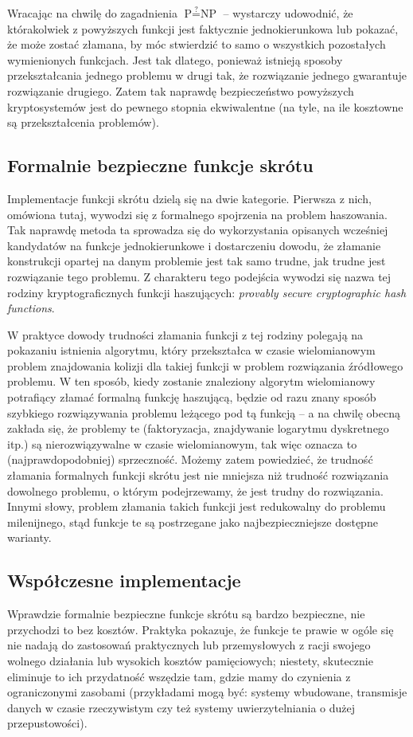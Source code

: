 \documentclass[12pt,a4paper,twoside]{article}
\begin{document}
Wracając na chwilę do zagadnienia $\textrm{P} \stackrel{?}{=} \textrm{NP}$ --
wystarczy udowodnić, że którakolwiek z powyższych funkcji jest faktycznie
jednokierunkowa lub pokazać, że może zostać złamana, by móc stwierdzić to samo
o wszystkich pozostałych wymienionych funkcjach. Jest tak dlatego, ponieważ
istnieją sposoby przekształcania jednego problemu w drugi tak, że rozwiązanie
jednego gwarantuje rozwiązanie drugiego. Zatem tak naprawdę bezpieczeństwo
powyższych kryptosystemów jest do pewnego stopnia ekwiwalentne (na tyle, na ile
kosztowne są przekształcenia problemów).



\subsection{Formalnie bezpieczne funkcje skrótu}
Implementacje funkcji skrótu dzielą się na dwie kategorie. Pierwsza z nich,
omówiona tutaj, wywodzi się z formalnego spojrzenia na problem haszowania. Tak
naprawdę metoda ta sprowadza się do wykorzystania opisanych wcześniej
kandydatów na funkcje jednokierunkowe i dostarczeniu dowodu, że złamanie
konstrukcji opartej na danym problemie jest tak samo trudne, jak trudne jest
rozwiązanie tego problemu. Z charakteru tego podejścia wywodzi się nazwa tej
rodziny kryptograficznych funkcji haszujących: \textit{provably secure
cryptographic hash functions}.

W praktyce dowody trudności złamania funkcji z tej rodziny polegają na
pokazaniu istnienia algorytmu, który przekształca w czasie wielomianowym
problem znajdowania kolizji dla takiej funkcji w problem rozwiązania źródłowego
problemu. W ten sposób, kiedy zostanie znaleziony algorytm wielomianowy
potrafiący złamać formalną funkcję haszującą, będzie od razu znany sposób
szybkiego rozwiązywania problemu leżącego pod tą funkcją -- a na chwilę obecną
zakłada się, że problemy te (faktoryzacja, znajdywanie logarytmu dyskretnego
itp.) są nierozwiązywalne w czasie wielomianowym, tak więc oznacza to
(najprawdopodobniej) sprzeczność. Możemy zatem powiedzieć, że trudność złamania
formalnych funkcji skrótu jest nie mniejsza niż trudność rozwiązania dowolnego
problemu, o którym podejrzewamy, że jest trudny do rozwiązania. Innymi słowy,
problem złamania takich funkcji jest redukowalny do problemu milenijnego, stąd
funkcje te są postrzegane jako najbezpieczniejsze dostępne warianty.



\subsection{Współczesne implementacje}
Wprawdzie formalnie bezpieczne funkcje skrótu są bardzo bezpieczne, nie
przychodzi to bez kosztów. Praktyka pokazuje, że funkcje te prawie w ogóle się
nie nadają do zastosowań praktycznych lub przemysłowych z racji swojego wolnego
działania lub wysokich kosztów pamięciowych; niestety, skutecznie eliminuje to
ich przydatność wszędzie tam, gdzie mamy do czynienia z ograniczonymi zasobami
(przykładami mogą być: systemy wbudowane, transmisje danych w czasie
rzeczywistym czy też systemy uwierzytelniania o dużej przepustowości).
\end{document}
